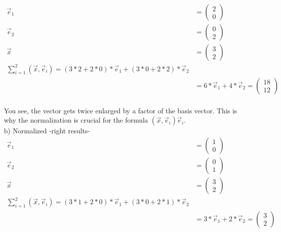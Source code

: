 \documentclass[a4paper]{article}
\begin{document}
\begin{Example}
\begin{displaymath}
\begin{align}
\vec{e}_{1} &= \begin{pmatrix}2\\0\end{pmatrix}\\
\vec{e}_{2} &= \begin{pmatrix}0\\2\end{pmatrix}\\
\vec{x} &= \begin{pmatrix}3\\2\end{pmatrix}\\
\sum_{i=1}^{2}(\vec{x},\vec{e}_i) = (3*2+2*0)*\vec{e}_{1} + (3*0+2*2)*\vec{e}_{2}\\ 
&= 6*\vec{e}_{1} + 4*\vec{e}_{2} = \begin{pmatrix}18\\12\end{pmatrix}\\
\end{align}
\end{displaymath}

You see, the vector gets twice enlarged by a factor of the basis vector. This is why the normalization is crucial for the formula  $(\vec{x},\vec{e}_{i})\vec{e}_{i}$.\\

b) Normalized -right results-\\

\begin{displaymath}
\begin{align}
\vec{e}_{1} &= \begin{pmatrix}1\\0\end{pmatrix}\\
\vec{e}_{2} &= \begin{pmatrix}0\\1\end{pmatrix}\\
\vec{x} &= \begin{pmatrix}3\\2\end{pmatrix}\\
\sum_{i=1}^{2}(\vec{x},\vec{e}_i) = (3*1+2*0)*\vec{e}_{1} + (3*0+2*1)*\vec{e}_{2}\\ 
&= 3*\vec{e}_{1} + 2*\vec{e}_{2} = \begin{pmatrix}3\\2\end{pmatrix}\\
\end{align}
\end{displaymath}



\end{Example}
\end{document}
